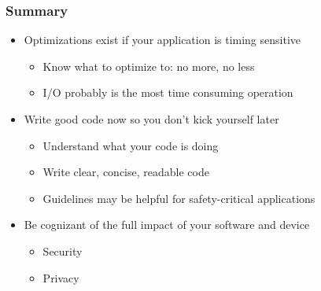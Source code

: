 \documentclass{beamer}
\begin{document}
\begin{frame}
\frametitle{Summary}
\begin{itemize}
  \item Optimizations exist if your application is timing sensitive
  \begin{itemize}
    \item Know what to optimize to: no more, no less
    \item I/O probably is the most time consuming operation
  \end{itemize}
  \item Write good code now so you don't kick yourself later
  \begin{itemize}
    \item Understand what your code is doing
    \item Write clear, concise, readable code
    \item Guidelines may be helpful for safety-critical applications
  \end{itemize}  
  \item Be cognizant of the full impact of your software and device
  \begin{itemize}
    \item Security
    \item Privacy
  \end{itemize}  
\end{itemize}
\end{frame}
\end{document}
